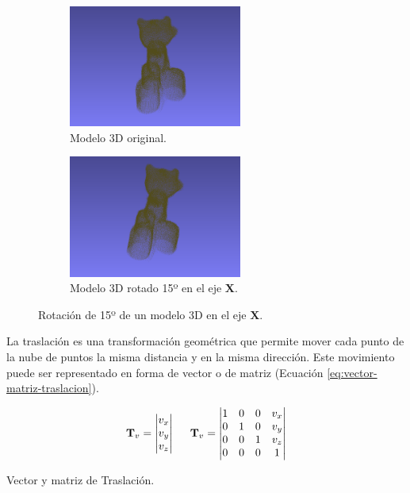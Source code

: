 \begin{figure}[h]
    \centering
    \begin{subfigure}[t]{0.33\textheight}
    	\centering
        \includegraphics[height=4cm]{archivos/rotacion-15-original.png}
        \caption{Modelo 3D original.}
    \end{subfigure}
    \begin{subfigure}[t]{0.33\textheight}
    	\centering
        \includegraphics[height=4cm]{archivos/rotacion-15-rotado.png}
        \caption{Modelo 3D rotado 15º en el eje $\mathbf{X}$.}
    \end{subfigure}
    \caption{Rotación de 15º de un modelo 3D en el eje $\mathbf{X}$.}
    \label{fig:modelo-rotado-15-eje-x}
\end{figure}

La traslación \citep{wiki:translation-matrix} es una transformación geométrica que permite mover cada punto de la nube de puntos la misma distancia y en la misma dirección. Este movimiento puede ser representado en forma de vector o de matriz (Ecuación \ref{eq:vector-matriz-traslacion}).

\begin{customequation}[h!]
    \begin{equation}
        \mathbf{T}_{v}
        =
        \begin{vmatrix}
            v_{x} \\
            v_{y} \\
            v_{z}
        \end{vmatrix}
        \hspace{0.5cm}
        \mathbf{T}_{v}
        =
        \begin{vmatrix}
            1 & 0 & 0 & v_{x} \\
            0 & 1 & 0 & v_{y} \\
            0 & 0 & 1 & v_{z} \\
            0 & 0 & 0 & 1 \\
        \end{vmatrix}
    \end{equation}
    \caption{Vector y matriz de Traslación.}
    \label{eq:vector-matriz-traslacion}
\end{customequation}

